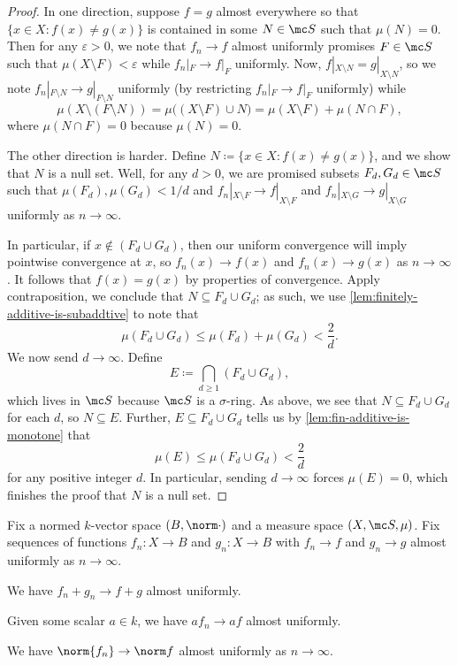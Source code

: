 \documentclass[../notes.tex]{subfiles}
\begin{document}
\begin{proof}
	In one direction, suppose $f=g$ almost everywhere so that $\{x\in X:f(x)\ne g(x)\}$ is contained in some $N\in\mc S$ such that $\mu(N)=0$. Then for any $\varepsilon>0$, we note that $f_n\to f$ almost uniformly promises $F\in\mc S$ such that $\mu(X\setminus F)<\varepsilon$ while $f_n|_F\to f|_F$ uniformly. Now, $f|_{X\setminus N}=g|_{X\setminus N}$, so we note $f_n|_{F\setminus N}\to g|_{F\setminus N}$ uniformly (by restricting $f_n|_F\to f|_F$ uniformly) while
	\[\mu(X\setminus(F\setminus N))=\mu\big((X\setminus F)\cup N\big)=\mu(X\setminus F)+\mu(N\cap F),\]
	where $\mu(N\cap F)=0$ because $\mu(N)=0$.

	The other direction is harder. Define $N\coloneqq\{x\in X:f(x)\ne g(x)\}$, and we show that $N$ is a null set. Well, for any $d>0$, we are promised subsets $F_d,G_d\in\mc S$ such that $\mu(F_d),\mu(G_d)<1/d$ and $f_n|_{X\setminus F}\to f|_{X\setminus F}$ and $f_n|_{X\setminus G}\to g|_{X\setminus G}$ uniformly as $n\to\infty$.

	In particular, if $x\notin(F_d\cup G_d)$, then our uniform convergence will imply pointwise convergence at $x$, so $f_n(x)\to f(x)$ and $f_n(x)\to g(x)$ as $n\to\infty$. It follows that $f(x)=g(x)$ by properties of convergence. Apply contraposition, we conclude that $N\subseteq F_d\cup G_d$; as such, we use \autoref{lem:finitely-additive-is-subaddtive} to note that
	\[\mu(F_d\cup G_d)\le\mu(F_d)+\mu(G_d)<\frac2d.\]
	We now send $d\to\infty$. Define
	\[E\coloneqq\bigcap_{d\ge1}(F_d\cup G_d),\]
	which lives in $\mc S$ because $\mc S$ is a $\sigma$-ring. As above, we see that $N\subseteq F_d\cup G_d$ for each $d$, so $N\subseteq E$. Further, $E\subseteq F_d\cup G_d$ tells us by \autoref{lem:fin-additive-is-monotone} that
	\[\mu(E)\le\mu(F_d\cup G_d)<\frac2d\]
	for any positive integer $d$. In particular, sending $d\to\infty$ forces $\mu(E)=0$, which finishes the proof that $N$ is a null set.
\end{proof}
\begin{lemma}
	Fix a normed $k$-vector space $(B,\norm\cdot)$ and a measure space $(X,\mc S,\mu)$. Fix sequences of functions $f_n\colon X\to B$ and $g_n\colon X\to B$ with $f_n\to f$ and $g_n\to g$ almost uniformly as $n\to\infty$.
	\begin{listalph}
		\item We have $f_n+g_n\to f+g$ almost uniformly.
		\item Given some scalar $a\in k$, we have $af_n\to af$ almost uniformly.
		\item We have $\norm{f_n}\to\norm f$ almost uniformly as $n\to\infty$.
	\end{listalph}
\end{lemma}
\end{document}
